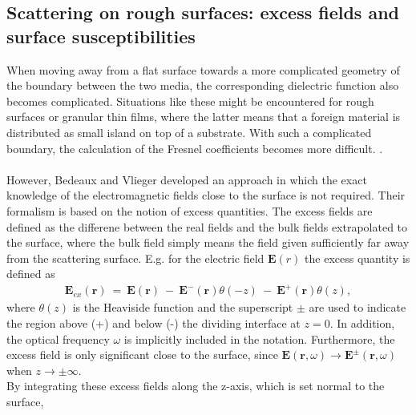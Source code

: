 \subsection{Scattering on rough surfaces: excess fields and surface susceptibilities}
When moving away from a flat surface towards a more complicated geometry of the boundary 
between the two media, the corresponding dielectric function also becomes complicated.
Situations like these might be encountered for rough surfaces or granular thin films, where the latter
means that a foreign material is distributed as small island on top of a substrate. 
With such a complicated boundary, the calculation of the Fresnel coefficients becomes more difficult.
\cite[p.~125]{Lazzari2002}.
\\
\\
However, Bedeaux and Vlieger \cite{BedeauxVliegerBook} %
developed an approach in which the exact knowledge
of the electromagnetic fields close to the surface is not required. Their formalism is based on the notion 
of excess quantities. 
The excess fields are defined as the differene between the real fields and the bulk fields extrapolated
to the surface, where the bulk field simply means the field given sufficiently far away from the
scattering surface. E.g. for the electric field $\boldsymbol E(r)$ the excess quantity is defined as
%
\begin{align}
   \label{excessField1}
   \boldsymbol{E}_{ex} (\boldsymbol{r}) \:=\: \boldsymbol{E}(\boldsymbol{r}) 
   \:-\: \boldsymbol{E}^-(\boldsymbol{r})\theta(-z) \:-\: \boldsymbol{E}^+(\boldsymbol{r})\theta(z),
\end{align}
%
where $\theta(z)$ is the Heaviside function and the superscript $\pm$ are used to indicate the region
above (+) and below (-) the dividing interface at $z = 0$. In addition, the optical frequency $\omega$
is implicitly included in the notation. Furthermore, the excess field is only significant close
to the surface, since $\boldsymbol{E}(\boldsymbol{r},\omega) \rightarrow 
\boldsymbol{E}^{\pm}(\boldsymbol{r},\omega)$ when $z \rightarrow \pm \infty$. \\
By integrating these excess fields along the z-axis, which is set normal to the surface,
%
